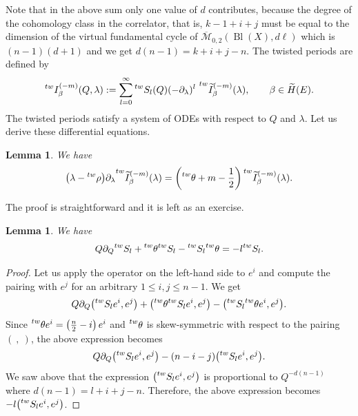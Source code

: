 \documentclass[10pt,a4paper]{article}
\numberwithin{equation}{section}
\newtheorem{Lemma}[Theorem]{Lemma}
\newcommand{\leftexp}[2]{{\vphantom{#2}}^{#1}{#2}}
\begin{document}
Note that in the above sum only one value of $d$ contributes, because the degree of the cohomology class in the correlator, that is, $k-1+i+j$ must be equal to the dimension of the virtual fundamental cycle of $\overline{\mathcal{M}}_{0,2}(\operatorname{Bl}(X),d\ell) $ which is $(n-1)(d+1)$ and we get $d(n-1) = k+i+j-n$.
 The twisted periods are defined by
 \[
 \leftexp{tw}{I}^{(-m)}_\beta(Q,\lambda) :=
 \sum_{l=0}^\infty
\leftexp{tw}{S}_l(Q) (-\partial_\lambda)^l\
 \leftexp{tw}{\widetilde{I}}^{(-m)}_\beta(\lambda),\qquad
 \beta\in \widetilde{H}(E).
 \]
The twisted periods satisfy a system of ODEs with respect to $Q$ and
$\lambda$. Let us derive these differential equations.
\begin{Lemma}\label{le:de-tw-calibr-period}
We have
\[
\big(\lambda-\leftexp{tw}{\rho}\big)\partial_\lambda
\leftexp{tw}{\widetilde{I}_\beta^{(-m)}}(\lambda)=
\left(
\leftexp{tw}{\theta}+m-\frac{1}{2}\right)
\leftexp{tw}{\widetilde{I}_\beta^{(-m)}}(\lambda).
\]
\end{Lemma}
The proof is straightforward and it is left as an exercise.
\begin{Lemma}\label{le:homog-tw-caibr}
We have
\[
Q\partial_Q \leftexp{tw}{S}_l +
\leftexp{tw}{\theta} \leftexp{tw}{S}_l -
\leftexp{tw}{S}_l \leftexp{tw}{\theta} = -l \leftexp{tw}{S}_l.
\]
\end{Lemma}
\begin{proof}
Let us apply the operator on the left-hand side to $e^i$ and compute the pairing
with $e^j$ for an arbitrary $1\leq i,j\leq n-1$. We get
\[
Q\partial_Q \big(\leftexp{tw}{S}_l e^i,e^j\big)+
\big(\leftexp{tw}{\theta} \leftexp{tw}{S}_l e^i,e^j\big)-
\big(\leftexp{tw}{S}_l \leftexp{tw}{\theta} e^i, e^j\big).
\]
Since $\leftexp{tw}{\theta} e^i= \left(\frac{n}{2}-i\right) e^i$ and
$\leftexp{tw}{\theta} $ is skew-symmetric with respect to the pairing
$(\ ,\ )$, the above expression becomes
\[
Q\partial_Q \big(\leftexp{tw}{S}_l e^i,e^j\big) -(n-i-j) \big(\leftexp{tw}{S}_l e^i,e^j\big).
\]
We saw above that the expression $\big(\leftexp{tw}{S}_l e^i,e^j\big)$ is
proportional to $Q^{-d(n-1)}$ where $d(n-1)=l+i+j-n$. Therefore, the
above expression becomes $-l \big(\leftexp{tw}{S}_l e^i,e^j\big)$.
\end{proof}
\end{document}
